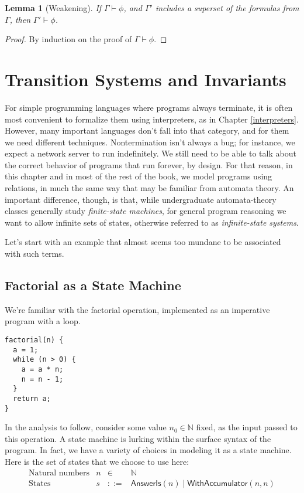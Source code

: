 \documentclass{amsbook}
\newtheorem{lemma}[theorem]{Lemma}
\theoremstyle{definition}
\theoremstyle{remark}
\numberwithin{section}{chapter}
\numberwithin{equation}{chapter}
\begin{document}
\begin{lemma}[Weakening]\label{valid_weaken}
  If $\Gamma \vdash \phi$, and $\Gamma'$ includes a superset of the formulas from $\Gamma$, then $\Gamma' \vdash \phi$.
\end{lemma}
\begin{proof}
  By induction on the proof of $\Gamma \vdash \phi$.
\end{proof}



\chapter{Transition Systems and Invariants}

For simple programming languages where programs always terminate, it is often most convenient to formalize them using interpreters, as in Chapter \ref{interpreters}.
However, many important languages don't fall into that category, and for them we need different techniques.
Nontermination isn't always a bug; for instance, we expect a network server to run indefinitely.
We still need to be able to talk about the correct behavior of programs that run forever, by design.
For that reason, in this chapter and in most of the rest of the book, we model programs using relations, in much the same way that may be familiar from automata theory.
An important difference, though, is that, while undergraduate automata-theory classes generally study \emph{finite-state machines}, for general program reasoning we want to allow infinite sets of states, otherwise referred to as \emph{infinite-state systems}.

Let's start with an example that almost seems too mundane to be associated with such terms.

\section{Factorial as a State Machine}

We're familiar with the factorial operation, implemented as an imperative program with a loop.
\begin{verbatim}
factorial(n) {
  a = 1;
  while (n > 0) {
    a = a * n;
    n = n - 1;
  }
  return a;
}
\end{verbatim}

In the analysis to follow, consider some value $n_0 \in \mathbb N$ fixed, as the input passed to this operation.
A state machine is lurking within the surface syntax of the program.
\encoding
In fact, we have a variety of choices in modeling it as a state machine.
Here is the set of states that we choose to use here:
$$\begin{array}{rrcl}
  \textrm{Natural numbers} & n &\in& \mathbb N \\
  \textrm{States} & s &::=& \mathsf{AnswerIs}(n) \mid \mathsf{WithAccumulator}(n, n)
\end{array}$$
\end{document}
